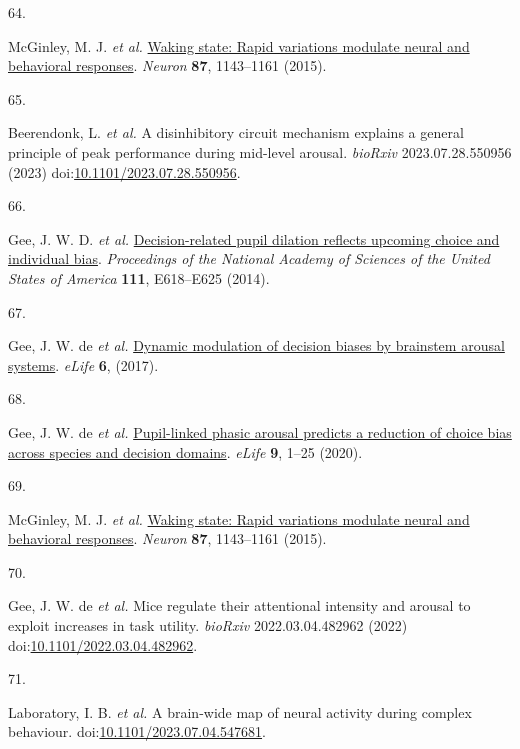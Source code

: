 \documentclass[
]{article}
\newlength{\cslhangindent}
\newlength{\csllabelwidth}
\newlength{\cslentryspacingunit} %
\newenvironment{CSLReferences}[2] %
 {%
  \setlength{\parindent}{0pt}
  \ifodd #1
  \let\oldpar\par
  \def\par{\hangindent=\cslhangindent\oldpar}
  \fi
  \setlength{\parskip}{#2\cslentryspacingunit}
 }%
 {}
\newcommand{\CSLLeftMargin}[1]{\parbox[t]{\csllabelwidth}{#1}}
\newcommand{\CSLRightInline}[1]{\parbox[t]{\linewidth - \csllabelwidth}{#1}\break}
\begin{document}
\begin{CSLReferences}{0}{0}
\leavevmode{}%
\CSLLeftMargin{64. }%
\CSLRightInline{McGinley, M. J. \emph{et al.}
\href{https://doi.org/10.1016/j.neuron.2015.09.012}{Waking state: Rapid
variations modulate neural and behavioral responses}. \emph{Neuron}
\textbf{87}, 1143--1161 (2015).}

\leavevmode{}%
\CSLLeftMargin{65. }%
\CSLRightInline{Beerendonk, L. \emph{et al.} A disinhibitory circuit
mechanism explains a general principle of peak performance during
mid-level arousal. \emph{bioRxiv} 2023.07.28.550956 (2023)
doi:\href{https://doi.org/10.1101/2023.07.28.550956}{10.1101/2023.07.28.550956}.}

\leavevmode{}%
\CSLLeftMargin{66. }%
\CSLRightInline{Gee, J. W. D. \emph{et al.}
\href{https://doi.org/10.1073/PNAS.1317557111/SUPPL_FILE/PNAS.201317557SI.PDF}{Decision-related
pupil dilation reflects upcoming choice and individual bias}.
\emph{Proceedings of the National Academy of Sciences of the United
States of America} \textbf{111}, E618--E625 (2014).}

\leavevmode{}%
\CSLLeftMargin{67. }%
\CSLRightInline{Gee, J. W. de \emph{et al.}
\href{https://doi.org/10.7554/ELIFE.23232}{Dynamic modulation of
decision biases by brainstem arousal systems}. \emph{eLife} \textbf{6},
(2017).}

\leavevmode{}%
\CSLLeftMargin{68. }%
\CSLRightInline{Gee, J. W. de \emph{et al.}
\href{https://doi.org/10.7554/ELIFE.54014}{Pupil-linked phasic arousal
predicts a reduction of choice bias across species and decision
domains}. \emph{eLife} \textbf{9}, 1--25 (2020).}

\leavevmode{}%
\CSLLeftMargin{69. }%
\CSLRightInline{McGinley, M. J. \emph{et al.}
\href{https://doi.org/10.1016/j.neuron.2015.09.012}{Waking state: Rapid
variations modulate neural and behavioral responses}. \emph{Neuron}
\textbf{87}, 1143--1161 (2015).}

\leavevmode{}%
\CSLLeftMargin{70. }%
\CSLRightInline{Gee, J. W. de \emph{et al.} Mice regulate their
attentional intensity and arousal to exploit increases in task utility.
\emph{bioRxiv} 2022.03.04.482962 (2022)
doi:\href{https://doi.org/10.1101/2022.03.04.482962}{10.1101/2022.03.04.482962}.}

\leavevmode{}%
\CSLLeftMargin{71. }%
\CSLRightInline{Laboratory, I. B. \emph{et al.} A brain-wide map of
neural activity during complex behaviour.
doi:\href{https://doi.org/10.1101/2023.07.04.547681}{10.1101/2023.07.04.547681}.}


\end{CSLReferences}
\end{document}
